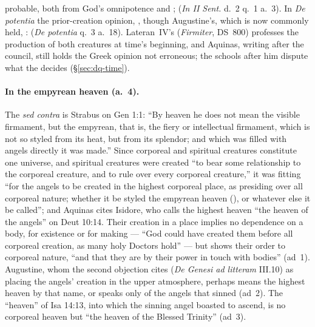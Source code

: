 probable, both from God's omnipotence and ;  (\emph{In II Sent.} d.~2 q.~1 a.~3).
In \emph{De potentia} the prior-creation opinion, , though Augustine's, which
is now commonly held, :  (\emph{De potentia} q.~3 a.~18). Lateran~IV's  (\emph{Firmiter}, DS~800) professes the production of
both creatures at time's beginning, and Aquinas, writing after the
council, still holds the Greek opinion not erroneous; the schools after
him dispute what the  decides (\S\ref{sec:dq-time}).

\paragraph{In the empyrean heaven (a.~4).} The \emph{sed contra} is
Strabus on Gen 1:1: ``By heaven he does not mean the visible firmament,
but the empyrean, that is, the fiery or intellectual firmament, which is
not so styled from its heat, but from its splendor; and which was filled
with angels directly it was made.'' Since corporeal
and spiritual creatures constitute one universe, and spiritual creatures
were created ``to bear some relationship to the corporeal creature, and
to rule over every corporeal creature,'' it was fitting ``for the angels
to be created in the highest corporeal place, as presiding over all
corporeal nature; whether it be styled the empyrean heaven
(), or whatever else it be called''; and Aquinas
cites Isidore, who calls the highest heaven ``the heaven of the angels''
on Deut 10:14. Their creation in a place implies no dependence on a
body, for existence or for making --- ``God could have created them
before all corporeal creation, as many holy Doctors hold'' --- but shows
their order to corporeal nature, ``and that they are by their power in
touch with bodies'' (ad~1). Augustine, whom the second objection cites
(\emph{De Genesi ad litteram} III.10) as placing the angels' creation in
the upper atmosphere, perhaps means the highest heaven by that name, or
speaks only of the angels that sinned (ad~2). The ``heaven'' of
Isa 14:13, into which the sinning angel boasted to ascend, is no
corporeal heaven but ``the heaven of the Blessed Trinity'' (ad~3).

